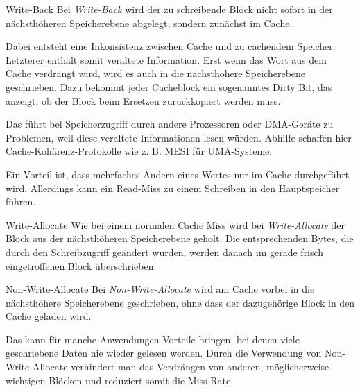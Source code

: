 \begin{defi}[Schreibstrategie]{Write-Back}
    Bei \emph{Write-Back} wird der zu schreibende Block nicht sofort in der nächsthöheren Speicherebene abgelegt, sondern zunächst im Cache.

    Dabei entsteht eine Inkonsistenz zwischen Cache und zu cachendem Speicher.
    Letzterer enthält somit veraltete Information.
    Erst wenn das Wort aus dem Cache verdrängt wird, wird es auch in die nächsthöhere Speicherebene geschrieben.
    Dazu bekommt jeder Cacheblock ein sogenanntes Dirty Bit, das anzeigt, ob der Block beim Ersetzen zurückkopiert werden muss.

    Das führt bei Speicherzugriff durch andere Prozessoren oder DMA-Geräte zu Problemen, weil diese veraltete Informationen lesen würden.
    Abhilfe schaffen hier Cache-Kohärenz-Protokolle wie z. B. MESI für UMA-Systeme.

    Ein Vorteil ist, dass mehrfaches Ändern eines Wertes nur im Cache durchgeführt wird.
    Allerdings kann ein Read-Miss zu einem Schreiben in den Hauptspeicher führen.
\end{defi}

\begin{bonus}[Schreibstrategie]{Write-Allocate}
    Wie bei einem normalen Cache Miss wird bei \emph{Write-Allocate} der Block aus der nächsthöheren Speicherebene geholt.
    Die entsprechenden Bytes, die durch den Schreibzugriff geändert wurden, werden danach im gerade frisch eingetroffenen Block überschrieben.
\end{bonus}

\begin{bonus}[Schreibstrategie]{Non-Write-Allocate}
    Bei \emph{Non-Write-Allocate} wird am Cache vorbei in die nächsthöhere Speicherebene geschrieben, ohne dass der dazugehörige Block in den Cache geladen wird.

    Das kann für manche Anwendungen Vorteile bringen, bei denen viele geschriebene Daten nie wieder gelesen werden.
    Durch die Verwendung von Non-Write-Allocate verhindert man das Verdrängen von anderen, möglicherweise wichtigen Blöcken und reduziert somit die Miss Rate.
\end{bonus}

